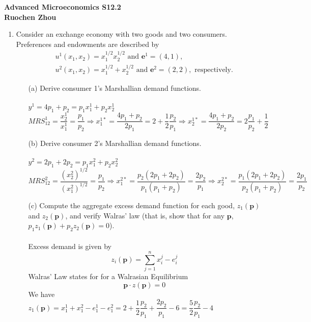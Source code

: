 \documentclass[11pt]{article}
\begin{document}
\begin{center}
\textbf{Advanced Microeconomics S12.2\\}
\textbf{Ruochen Zhou}
\end{center}

\begin{enumerate}
\item Consider an exchange economy with two goods and two consumers. Preferences and endowments are described by
 	\begin{eqnarray*}
	&&u^{1}(x_{1},x_{2})	=x_{1}^{1/2}x_{2}^{1/2}\text{ and }\mathbf{e}^{1}=(4,1),\\
	&& u^{2}(x_{1},x_{2})=x_{1}^{1/2}+x_{2}^{1/2}\text{ and }\mathbf{e}^{2}=(2,2),\text{ respectively.}
	\end{eqnarray*}
	\begin{itemize}
	\item[(a)] Derive consumer 1's Marshallian demand functions.
	\smallskip\\\\
	$y^1=4p_1+p_2=p_1x_1^1+p_2x_2^1$\\
	$MRS_{12}^1=\dfrac{x_2^1}{x_1^1}=\dfrac{p_1}{p_2}\Rightarrow x_1^{1*}=\dfrac{4p_1+p_2}{2p_1}=2+\dfrac{1}{2}\dfrac{p_2}{p_1}\Rightarrow x_2^{1*}=\dfrac{4p_1+p_2}{2p_2}=2\dfrac{p_1}{p_2}+\dfrac{1}{2}$\\
	\item[(b)] Derive consumer 2's Marshallian demand functions.
	\smallskip\\\\
	$y^2=2p_1+2p_2=p_1x_1^2+p_2x_2^2$\\
	$MRS_{12}^2=\dfrac{(x_2^2)^{1/2}}{(x_1^2)^{1/2}}=\dfrac{p_1}{p_2}\Rightarrow x_1^{2*}=\dfrac{p_2(2p_1+2p_2)}{p_1(p_1+p_2)}=\dfrac{2p_2}{p_1}\Rightarrow x_2^{2*}=\dfrac{p_1(2p_1+2p_2)}{p_2(p_1+p_2)}=\dfrac{2p_1}{p_2}$\\
	\item[(c)] Compute the aggregate excess demand function for each good, $z_{1}(\mathbf{p})$ and $z_{2}(\mathbf{p})$, and verify Walras' law (that is, show that for any $\mathbf{p}$, $p_{1}z_{1}(\mathbf{p})+p_{2}z_{2}(\mathbf{p})=0$).
	\smallskip\\\\
	Excess demand is given by\\
	$$z_i(\textbf{p})=\sum_{j=1}^nx_i^j-e_i^j$$
	Walras' Law states for for a Walrasian Equilibrium\\
	$$\textbf{p}\cdot z(\textbf{p})=0$$
	We have\\
	$z_1(\textbf{p})=x_1^1+x_1^2-e_1^1-e_1^2=2+\dfrac{1}{2}\dfrac{p_2}{p_1}+\dfrac{2p_2}{p_1}-6=\dfrac{5}{2}\dfrac{p_2}{p_1}-4$\\

\end{itemize}
\end{enumerate}
\end{document}

